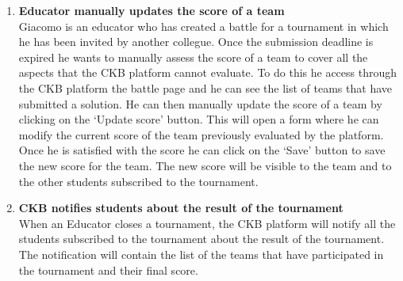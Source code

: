 \begin{enumerate}
    \item \textbf{Educator manually updates the score of a team} \\
    Giacomo is an educator who has created a battle for a tournament in which he has been invited by another collegue. Once the submission deadline is expired he wants to manually assess the score of a team to cover all the aspects that the CKB platform cannot evaluate. To do this he access through the CKB platform the battle page and he can see the list of teams that have submitted a solution. He can then manually update the score of a team by clicking on the `Update score' button. This will open a form where he can modify the current score of the team previously evaluated by the platform. Once he is satisfied with the score he can click on the `Save' button to save the new score for the team. The new score will be visible to the team and to the other students subscribed to the tournament.
    \item \textbf{CKB notifies students about the result of the tournament} \\
    When an Educator closes a tournament, the CKB platform will notify all the students subscribed to the tournament about the result of the tournament. The notification will contain the list of the teams that have participated in the tournament and their final score.

\end{enumerate}
